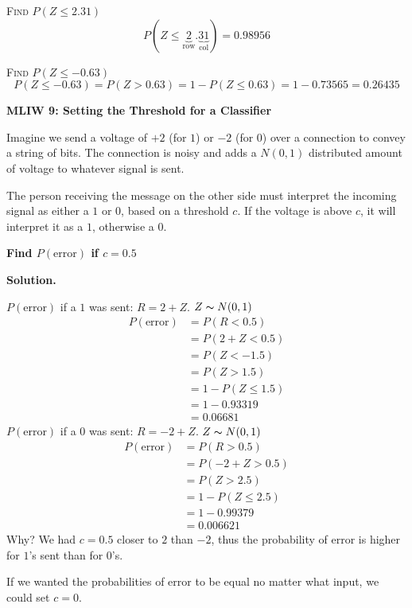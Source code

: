 \textsc{Find $ P(Z\le 2.31) $}
\[ P(Z\le \underbrace{2}_{\text{row}}.\underbrace{31}_{\text{col}})=0.98956 \]

\textsc{Find $ P(Z\le-0.63) $}
\[ P(Z\le-0.63)=P(Z>0.63)=1-P(Z\le 0.63)=1-0.73565=0.26435\]

\textbf{MLIW 9: Setting the Threshold for a Classifier}

Imagine we send a voltage of $ +2 $ (for $ 1 $) or $ -2 $ (for $ 0 $) over
a connection to convey a string of bits. The connection is noisy and adds
a $ N(0,1) $ distributed amount of voltage to whatever signal is sent.

The person receiving the message on the other side must interpret the incoming
signal as either a $ 1 $ or $ 0 $, based on a threshold $ c $. If the voltage
is above $ c $, it will interpret it as a $ 1 $, otherwise a $ 0 $.

\textbf{Find $P(\text{error})$ if $ c=0.5 $}

\textbf{Solution.}

$ P(\text{error}) $ if a $ 1 $ was sent: $ R =2+Z $. $ Z \thicksim N(0,1) $
\begin{align*}
    P(\text{error}) & =P(R<0.5)      \\
                    & =P(2+Z<0.5)    \\
                    & =P(Z<-1.5)     \\
                    & =P(Z> 1.5)     \\
                    & =1-P(Z\le 1.5) \\
                    & =1-0.93319     \\
                    & =0.06681
\end{align*}
$ P(\text{error}) $ if a $ 0 $ was sent: $ R=-2+Z $. $ Z \thicksim N(0,1) $
\begin{align*}
    P(\text{error}) & =P(R>0.5)      \\
                    & =P(-2+Z>0.5)   \\
                    & =P(Z>2.5)      \\
                    & =1-P(Z\le 2.5) \\
                    & =1-0.99379     \\
                    & =0.006621
\end{align*}
Why? We had $ c=0.5 $ closer to $ 2 $ than $ -2 $, thus the probability
of error is higher for $ 1 $'s sent than for $ 0 $'s.

If we wanted the probabilities of error to be equal no matter what input,
we could set $ c=0 $.

